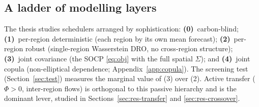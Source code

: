 \documentclass[12pt]{article}
\begin{document}
\subsection{A ladder of modelling layers}\label{sec:ladder}
The thesis studies schedulers arranged by sophistication: \textbf{(0)}~carbon-blind;
\textbf{(1)}~per-region deterministic (each region by its own mean forecast);
\textbf{(2)}~per-region robust (single-region Wasserstein DRO, no cross-region
structure); \textbf{(3)}~joint covariance (the SOCP \eqref{eq:obj} with the full
spatial $\Sigma$); and \textbf{(4)}~joint copula (non-elliptical dependence;
Appendix~\ref{app:copula}). The screening test (Section~\ref{sec:test}) measures the
marginal value of (3) over (2). Active transfer ($\Phi>0$, inter-region flows) is
orthogonal to this passive hierarchy and is the dominant lever, studied in
Sections~\ref{sec:res-transfer} and \ref{sec:res-crossover}.
\end{document}
